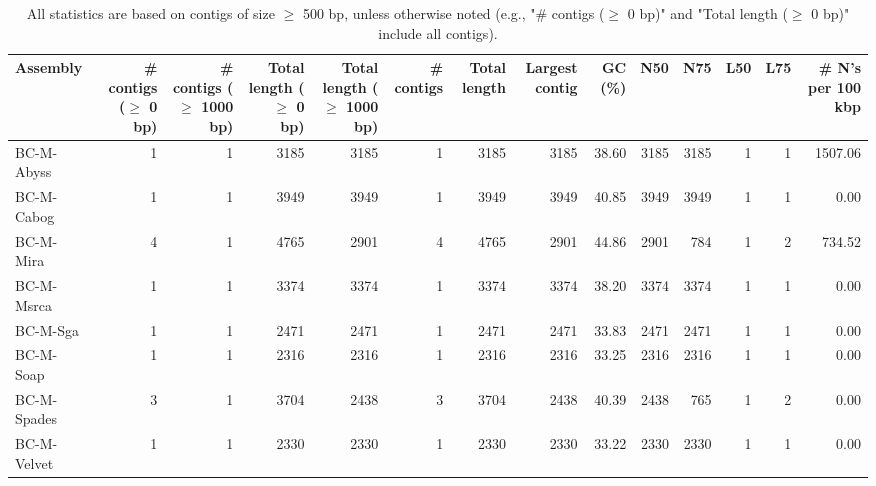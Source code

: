 \documentclass[12pt,a4paper]{article}
\begin{document}
\begin{table}[ht]
\begin{center}
\caption{All statistics are based on contigs of size $\geq$ 500 bp, unless otherwise noted (e.g., "\# contigs ($\geq$ 0 bp)" and "Total length ($\geq$ 0 bp)" include all contigs).}
\begin{tabular}{|l*{13}{|r}|}
\hline
Assembly & \# contigs ($\geq$ 0 bp) & \# contigs ($\geq$ 1000 bp) & Total length ($\geq$ 0 bp) & Total length ($\geq$ 1000 bp) & \# contigs & Total length & Largest contig & GC (\%) & N50 & N75 & L50 & L75 & \# N's per 100 kbp \\ \hline
BC-M-Abyss & 1 & 1 & 3185 & 3185 & 1 & 3185 & 3185 & 38.60 & 3185 & 3185 & 1 & 1 & 1507.06 \\ \hline
BC-M-Cabog & 1 & 1 & 3949 & 3949 & 1 & 3949 & 3949 & 40.85 & 3949 & 3949 & 1 & 1 & 0.00 \\ \hline
BC-M-Mira & 4 & 1 & 4765 & 2901 & 4 & 4765 & 2901 & 44.86 & 2901 & 784 & 1 & 2 & 734.52 \\ \hline
BC-M-Msrca & 1 & 1 & 3374 & 3374 & 1 & 3374 & 3374 & 38.20 & 3374 & 3374 & 1 & 1 & 0.00 \\ \hline
BC-M-Sga & 1 & 1 & 2471 & 2471 & 1 & 2471 & 2471 & 33.83 & 2471 & 2471 & 1 & 1 & 0.00 \\ \hline
BC-M-Soap & 1 & 1 & 2316 & 2316 & 1 & 2316 & 2316 & 33.25 & 2316 & 2316 & 1 & 1 & 0.00 \\ \hline
BC-M-Spades & 3 & 1 & 3704 & 2438 & 3 & 3704 & 2438 & 40.39 & 2438 & 765 & 1 & 2 & 0.00 \\ \hline
BC-M-Velvet & 1 & 1 & 2330 & 2330 & 1 & 2330 & 2330 & 33.22 & 2330 & 2330 & 1 & 1 & 0.00 \\ \hline
\end{tabular}
\end{center}
\end{table}
\end{document}
